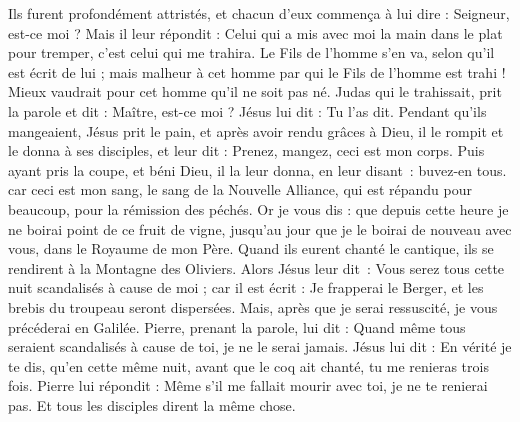 \begin{multicols}{2}
Ils furent profondément attristés, et chacun d'eux commença à lui dire : Seigneur, est-ce moi ?
Mais il leur répondit : Celui qui a mis avec moi la main dans le plat pour tremper, c'est celui qui me trahira.
Le Fils de l'homme s'en va, selon qu'il est écrit de lui ; mais malheur à cet homme par qui le Fils de l'homme est trahi ! Mieux vaudrait pour cet homme qu’il ne soit pas né.
Judas qui le trahissait, prit la parole et dit : Maître, est-ce moi ? Jésus lui dit : Tu l'as dit.
Pendant qu’ils mangeaient, Jésus prit le pain, et après avoir rendu grâces à Dieu, il le rompit et le donna à ses disciples, et leur dit : Prenez, mangez, ceci est mon corps.
Puis ayant pris la coupe, et béni Dieu, il la leur donna, en leur disant : buvez-en tous.
car ceci est mon sang, le sang de la Nouvelle Alliance, qui est répandu pour beaucoup, pour la rémission des péchés.
Or je vous dis : que depuis cette heure je ne boirai point de ce fruit de vigne, jusqu’au jour que je le boirai de nouveau avec vous, dans le Royaume de mon Père.
Quand ils eurent chanté le cantique, ils se rendirent à la Montagne des Oliviers.
Alors Jésus leur dit : Vous serez tous cette nuit scandalisés à cause de moi ; car il est écrit : Je frapperai le Berger, et les brebis du troupeau seront dispersées.
Mais, après que je serai ressuscité, je vous précéderai en Galilée.
Pierre, prenant la parole, lui dit : Quand même tous seraient scandalisés à cause de toi, je ne le serai jamais.
Jésus lui dit : En vérité je te dis, qu’en cette même nuit, avant que le coq ait chanté, tu me renieras trois fois.
Pierre lui répondit : Même s’il me fallait mourir avec toi, je ne te renierai pas. Et tous les disciples dirent la même chose.

\end{multicols}
